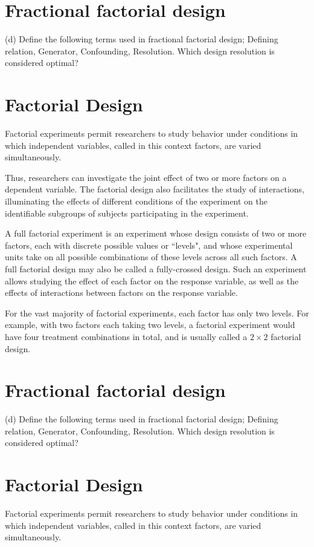 
\section{Fractional factorial design}

(d)	Define the following terms used in fractional factorial design; Defining relation,
Generator, Confounding, Resolution. Which design resolution is considered
optimal?
\section{Factorial Design}
Factorial experiments permit researchers to study behavior under conditions in which independent variables, called in this context factors, are varied simultaneously.

Thus, researchers can investigate the joint effect of two or more factors on a dependent variable. The factorial design also facilitates the study of interactions, illuminating the effects of different conditions of the experiment on the identifiable subgroups of subjects participating in the experiment.


A full factorial experiment is an experiment whose design consists of two or more factors, each with discrete possible values or ``levels", and whose experimental units take on all possible combinations of these levels across all such factors. A full factorial design may also be called a fully-crossed design. Such an experiment allows studying the effect of each factor on the response variable, as well as the effects of interactions between factors on the response variable.

For the vast majority of factorial experiments, each factor has only two levels. For example, with two factors each taking two levels, a factorial experiment would have four treatment combinations in total, and is usually called a $2\times2$ factorial design.

\newpage
\section{Fractional factorial design}

(d)	Define the following terms used in fractional factorial design; Defining relation,
Generator, Confounding, Resolution. Which design resolution is considered
optimal?
\section{Factorial Design}
Factorial experiments permit researchers to study behavior under conditions in which independent variables, called in this context factors, are varied simultaneously.

